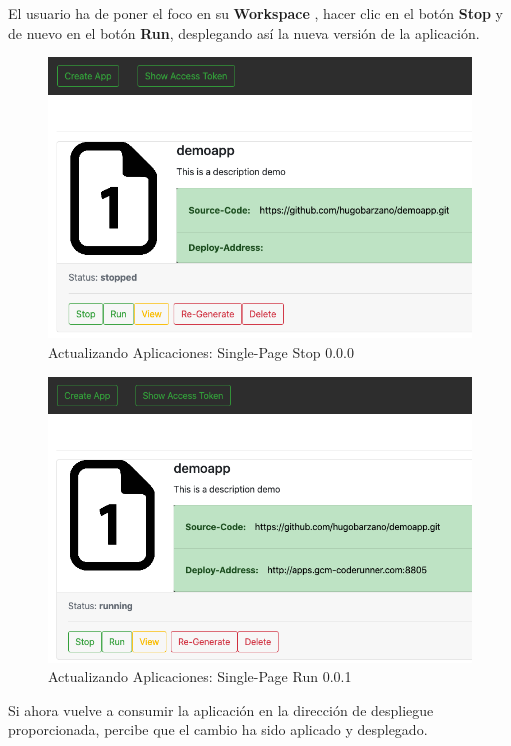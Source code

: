 \documentclass[a4paper,11pt]{book}
\begin{document}
 \newpage
 El usuario ha de poner el foco en su \textbf{Workspace} , hacer clic en el botón \textbf{Stop} y de nuevo en el botón \textbf{Run}, desplegando así la nueva versión de la aplicación. 
 
   \begin{figure}[H]
\centering
\includegraphics[scale=0.4]{imagenes/casouso_a/2_10.png}
\caption{   Actualizando Aplicaciones: Single-Page Stop 0.0.0  }
\label{2_10}
\end{figure}
 
 
   \begin{figure}[H]
\centering
\includegraphics[scale=0.4]{imagenes/casouso_a/2_11.png}
\caption{   Actualizando Aplicaciones: Single-Page Run 0.0.1  }
\label{2_11}
\end{figure}
 
 Si ahora vuelve a consumir la aplicación en la dirección de despliegue proporcionada, percibe que el cambio ha sido aplicado y desplegado. 
 
\end{document}
